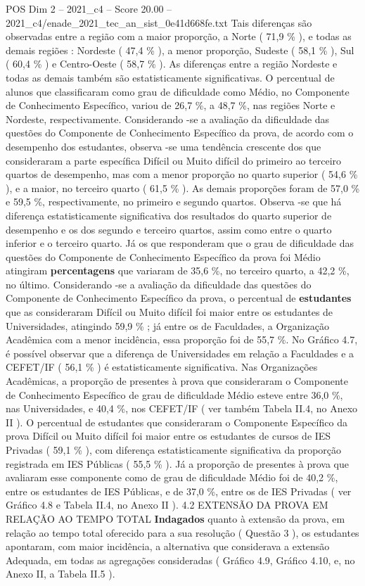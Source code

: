 \begin{textsample}{POS Dim 2 – 2021\_c4 – Score 20.00 – 2021\_c4/enade\_2021\_tec\_an\_sist\_0e41d668fe.txt}
Tais diferenças são observadas entre a região com a maior proporção, a Norte ( 71,9 \% ), e todas as demais regiões : Nordeste ( 47,4 \% ), a menor proporção, Sudeste ( 58,1 \% ), Sul ( 60,4 \% ) e Centro-Oeste ( 58,7 \% ).
As diferenças entre a região Nordeste e todas as demais também são estatisticamente significativas.
O percentual de alunos que classificaram como grau de dificuldade como Médio, no Componente de Conhecimento Específico, variou de 26,7 \%, a 48,7 \%, nas regiões Norte e Nordeste, respectivamente.
Considerando -se a avaliação da dificuldade das questões do Componente de Conhecimento Específico da prova, de acordo com o desempenho dos estudantes, observa -se uma tendência crescente dos que consideraram a parte específica Difícil ou Muito difícil do primeiro ao terceiro quartos de desempenho, mas com a menor proporção no quarto superior ( 54,6 \% ), e a maior, no terceiro quarto ( 61,5 \% ).
As demais proporções foram de 57,0 \% e 59,5 \%, respectivamente, no primeiro e segundo quartos.
Observa -se que há diferença estatisticamente significativa dos resultados do quarto superior de desempenho e os dos segundo e terceiro quartos, assim como entre o quarto inferior e o terceiro quarto.
Já os que responderam que o grau de dificuldade das questões do Componente de Conhecimento Específico da prova foi Médio atingiram \textbf{percentagens} que variaram de 35,6 \%, no terceiro quarto, a 42,2 \%, no último.
Considerando -se a avaliação da dificuldade das questões do Componente de Conhecimento Específico da prova, o percentual de \textbf{estudantes} que as consideraram Difícil ou Muito difícil foi maior entre os estudantes de Universidades, atingindo 59,9 \% ; já entre os de Faculdades, a Organização Acadêmica com a menor incidência, essa proporção foi de 55,7 \%.
No Gráfico 4.7, é possível observar que a diferença de Universidades em relação a Faculdades e a CEFET/IF ( 56,1 \% ) é estatisticamente significativa.
Nas Organizações Acadêmicas, a proporção de presentes à prova que consideraram o Componente de Conhecimento Específico de grau de dificuldade Médio esteve entre 36,0 \%, nas Universidades, e 40,4 \%, nos CEFET/IF ( ver também Tabela II.4, no Anexo II ).
O percentual de estudantes que consideraram o Componente Específico da prova Difícil ou Muito difícil foi maior entre os estudantes de cursos de IES Privadas ( 59,1 \% ), com diferença estatisticamente significativa da proporção registrada em IES Públicas ( 55,5 \% ).
Já a proporção de presentes à prova que avaliaram esse componente como de grau de dificuldade Médio foi de 40,2 \%, entre os estudantes de IES Públicas, e de 37,0 \%, entre os de IES Privadas ( ver Gráfico 4.8 e Tabela II.4, no Anexo II ). 4.2 EXTENSÃO DA PROVA EM RELAÇÃO AO TEMPO TOTAL \textbf{Indagados} quanto à extensão da prova, em relação ao tempo total oferecido para a sua resolução ( Questão 3 ), os estudantes apontaram, com maior incidência, a alternativa que considerava a extensão Adequada, em todas as agregações consideradas ( Gráfico 4.9, Gráfico 4.10, e, no Anexo II, a Tabela II.5 ).

\end{textsample}
